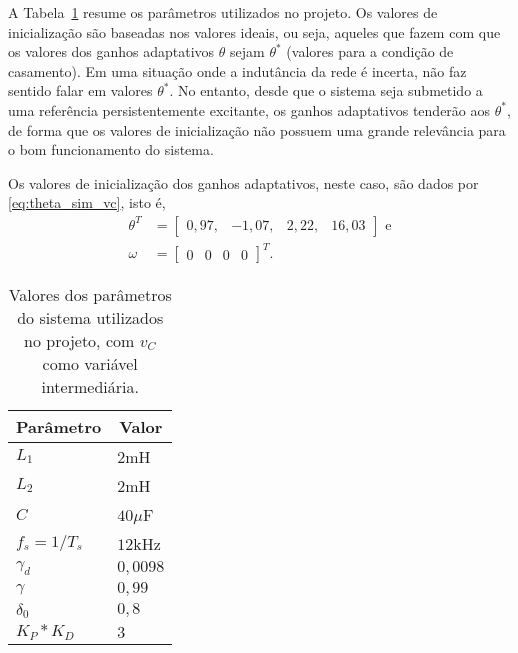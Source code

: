   A Tabela~\ref{tab:parametros_projeto_vc} resume os parâmetros utilizados no projeto. Os valores de inicialização são baseadas nos valores ideais, ou seja, aqueles que fazem com que os valores dos ganhos adaptativos $\theta$ sejam $\theta^*$ (valores para a condição de casamento). Em uma situação onde a indutância da rede é incerta, não faz sentido falar em valores $\theta^*$. No entanto, desde que o sistema seja submetido a uma referência persistentemente excitante, os ganhos adaptativos tenderão aos $\theta^*$, de forma que os valores de inicialização não possuem uma grande relevância para o bom funcionamento do sistema.

  Os valores de inicialização dos ganhos adaptativos, neste caso, são dados por \ref{eq:theta_sim_vc}, isto é,
  \begin{equation}
    \begin{split}
      \theta^T & = \left[ \begin{matrix} 0,97, & -1,07, & 2,22, & 16,03 \end{matrix} \right]\text{ e}\\
      \omega & = {\left[ \begin{matrix} 0 & 0 & 0 & 0 \end{matrix} \right]}^T\text{.}
    \end{split}
    \label{eq:theta_sim_vc}
  \end{equation}

  \begin{table}[htb]
    \renewcommand{\arraystretch}{1.35}
    \setlength{\tabcolsep}{1.2mm}
    \caption{Valores dos parâmetros do sistema utilizados no projeto, com $v_C$ como variável intermediária.}
    \label{tab:parametros_projeto_vc}
    \centering
    \begin{tabular}{l l}
      \hline
      \multicolumn{1}{c}{Parâmetro} & \multicolumn{1}{c}{Valor}\\
      \hline
      $L_1$         & $2$mH    \\
      $L_2$         & $2$mH    \\
      $C$           & $40\mu$F \\
      $f_s = 1/T_s$ & $12$kHz  \\
      $\gamma_d$    & $0,0098$ \\
      $\gamma$      & $0,99$   \\
      $\delta_0$    & $0,8$    \\
      $K_P*K_D$     & $3$      \\
      \hline
    \end{tabular}
  \end{table}

